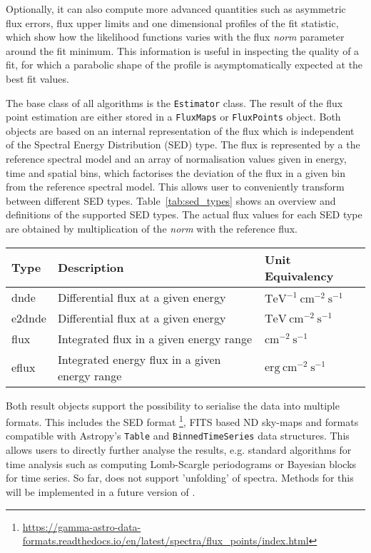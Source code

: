 \documentclass[traditabstract, longauth]{aa}
\newcommand{\code}[1]{\texttt{#1}}
\begin{document}
Optionally, it can also compute more advanced quantities
such as asymmetric flux errors, flux upper limits
and one dimensional profiles of the fit statistic,
which show how the likelihood functions varies with
the flux \textit{norm} parameter around the fit minimum.
This information is useful in inspecting the quality
of a fit, for which  a parabolic
shape of the profile is asymptomatically expected at the best fit
values.

The base class of all algorithms is the \code{Estimator}  class.
The result of the flux point estimation are either stored in a
\code{FluxMaps} or \code{FluxPoints} object. Both objects
are based on an internal representation of the flux which is
independent of the Spectral Energy Distribution (SED) type. The flux is represented by a
the reference spectral model and an array of
normalisation values given in energy, time and spatial bins,
which factorises the deviation of the flux in a given
bin from the reference spectral model. This allows
user to conveniently transform between different
SED types. Table~\ref{tab:sed_types} shows an
overview and definitions of the supported SED types.
The actual flux values for each SED type are obtained
by multiplication of the \textit{norm} with the reference flux.

\begin{table*}
    \begin{center}
        \begin{tabular}{lll}
         \hline
         Type & Description & Unit Equivalency \\
         \hline
         dnde & Differential flux at a given energy & $\mathrm{TeV^{-1}~cm^{-2}~s^{-1}}$ \\
         e2dnde & Differential flux at a given energy  & $\mathrm{TeV~cm^{-2}~s^{-1}}$ \\
         flux & Integrated flux in a given energy range & $\mathrm{cm^{-2}~s^{-1}}$ \\
         eflux & Integrated energy flux in a given energy range & $\mathrm{erg~cm^{-2}~s^{-1}}$\\
         \hline
        \end{tabular}
    \end{center}
    \caption{Definition of the different SED types supported in \gammapy.}
    \label{tab:sed_types}
\end{table*}


Both result objects support the possibility to serialise
the data into multiple formats. This includes the
\gadf SED format \footnote{\url{https://gamma-astro-data-formats.readthedocs.io/en/latest/spectra/flux_points/index.html}},
FITS based ND sky-maps and formats compatible with Astropy's \code{Table} and
\code{BinnedTimeSeries} data structures. This allows
users to directly further analyse the results, e.g.
standard algorithms for time analysis such as
computing Lomb-Scargle periodograms or Bayesian
blocks for time series. So far, \gammapy does not
support 'unfolding' of \gammaray spectra.
Methods for this will be implemented in a future version of \gammapy.
\end{document}
